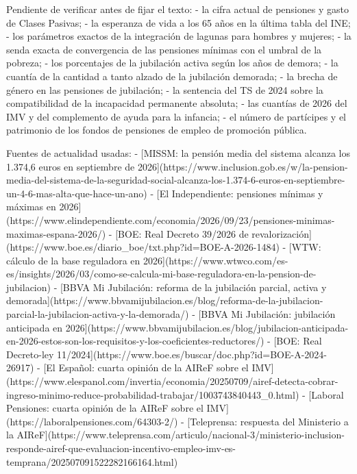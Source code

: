\documentclass[10pt,a4paper]{article}
\begin{document}
Pendiente de verificar antes de fijar el texto:
- la cifra actual de pensiones y gasto de Clases Pasivas;
- la esperanza de vida a los 65 años en la última tabla del INE;
- los parámetros exactos de la integración de lagunas para hombres y mujeres;
- la senda exacta de convergencia de las pensiones mínimas con el umbral de la pobreza;
- los porcentajes de la jubilación activa según los años de demora;
- la cuantía de la cantidad a tanto alzado de la jubilación demorada;
- la brecha de género en las pensiones de jubilación;
- la sentencia del TS de 2024 sobre la compatibilidad de la incapacidad permanente absoluta;
- las cuantías de 2026 del IMV y del complemento de ayuda para la infancia;
- el número de partícipes y el patrimonio de los fondos de pensiones de empleo de promoción pública.



Fuentes de actualidad usadas:
- [MISSM: la pensión media del sistema alcanza los 1.374,6 euros en septiembre de 2026](https://www.inclusion.gob.es/w/la-pension-media-del-sistema-de-la-seguridad-social-alcanza-los-1.374-6-euros-en-septiembre-un-4-6-mas-alta-que-hace-un-ano)
- [El Independiente: pensiones mínimas y máximas en 2026](https://www.elindependiente.com/economia/2026/09/23/pensiones-minimas-maximas-espana-2026/)
- [BOE: Real Decreto 39/2026 de revalorización](https://www.boe.es/diario_boe/txt.php?id=BOE-A-2026-1484)
- [WTW: cálculo de la base reguladora en 2026](https://www.wtwco.com/es-es/insights/2026/03/como-se-calcula-mi-base-reguladora-en-la-pension-de-jubilacion)
- [BBVA Mi Jubilación: reforma de la jubilación parcial, activa y demorada](https://www.bbvamijubilacion.es/blog/reforma-de-la-jubilacion-parcial-la-jubilacion-activa-y-la-demorada/)
- [BBVA Mi Jubilación: jubilación anticipada en 2026](https://www.bbvamijubilacion.es/blog/jubilacion-anticipada-en-2026-estos-son-los-requisitos-y-los-coeficientes-reductores/)
- [BOE: Real Decreto-ley 11/2024](https://www.boe.es/buscar/doc.php?id=BOE-A-2024-26917)
- [El Español: cuarta opinión de la AIReF sobre el IMV](https://www.elespanol.com/invertia/economia/20250709/airef-detecta-cobrar-ingreso-minimo-reduce-probabilidad-trabajar/1003743840443_0.html)
- [Laboral Pensiones: cuarta opinión de la AIReF sobre el IMV](https://laboralpensiones.com/64303-2/)
- [Teleprensa: respuesta del Ministerio a la AIReF](https://www.teleprensa.com/articulo/nacional-3/ministerio-inclusion-responde-airef-que-evaluacion-incentivo-empleo-imv-es-temprana/202507091522282166164.html)
\end{document}
